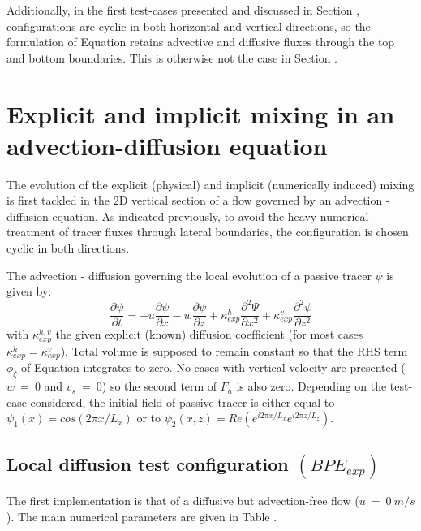 Additionally, in the first test-cases presented and discussed in Section , configurations are cyclic in both horizontal and vertical directions, so the formulation of Equation  retains advective and diffusive fluxes through the top and bottom boundaries. This is otherwise not the case in Section\color{red} \color{black}.

\section{Explicit and implicit mixing in an advection-diffusion equation}
\label{section_numlab}
The evolution of the explicit (physical) and implicit (numerically induced) mixing is first tackled in the 2D vertical section of a flow governed by an advection - diffusion equation. As indicated previously, to avoid the heavy numerical treatment of tracer fluxes through lateral boundaries, the configuration is chosen cyclic in both directions.

The advection - diffusion governing the local evolution of a passive tracer $\psi$ is given by:
\begin{equation}
\frac{\partial \psi}{\partial t} = -u\frac{\partial \psi}{\partial x} - w\frac{\partial \psi}{\partial z} + \kappa_{exp}^h \frac{\partial^2 \Psi}{\partial x^2} + \kappa_{exp}^v \frac{\partial^2 \psi}{\partial z^2}
\label{eqAdvDiff}
\end{equation}
with $\kappa_{exp}^{h,v}$ the given explicit (known) diffusion coefficient (for most cases $\kappa_{exp}^{h}=\kappa_{exp}^{v}$).
Total volume is supposed to remain constant so that the RHS term $\phi_{\zeta}$ of Equation  integrates to zero. No cases with vertical velocity are presented ($w\ =\ 0$ and $v_s\ =\ 0$) so the second term of $F_a$ is also zero.
Depending on the test-case considered, the initial field of passive tracer is either equal to $\psi_1(x)=cos(2\pi x/L_x)$ or to $\psi_2(x,z)=Re(e^{i2\pi x/L_x}e^{i 2 \pi z/L_z})$.

\subsection{Local diffusion test configuration $(BPE_{exp})$}

The first implementation is that of a diffusive but advection-free flow ($u\ =\ 0 \ m/s$). The main numerical parameters are given in Table .

